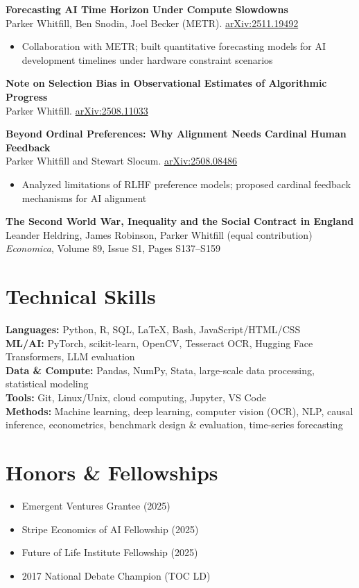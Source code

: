 \documentclass[11pt,letterpaper]{article}
\begin{document}
\vspace{4pt}

\textbf{Forecasting AI Time Horizon Under Compute Slowdowns} \\
Parker Whitfill, Ben Snodin, Joel Becker (METR). \href{https://arxiv.org/abs/2511.19492}{arXiv:2511.19492}
\begin{itemize}
    \item Collaboration with METR; built quantitative forecasting models for AI development timelines under hardware constraint scenarios
\end{itemize}

\vspace{4pt}

\textbf{Note on Selection Bias in Observational Estimates of Algorithmic Progress} \\
Parker Whitfill. \href{https://arxiv.org/abs/2508.11033}{arXiv:2508.11033}

\vspace{4pt}

\textbf{Beyond Ordinal Preferences: Why Alignment Needs Cardinal Human Feedback} \\
Parker Whitfill and Stewart Slocum. \href{https://arxiv.org/abs/2508.08486}{arXiv:2508.08486}
\begin{itemize}
    \item Analyzed limitations of RLHF preference models; proposed cardinal feedback mechanisms for AI alignment
\end{itemize}

\vspace{4pt}

\textbf{The Second World War, Inequality and the Social Contract in England} \\
Leander Heldring, James Robinson, Parker Whitfill (equal contribution) \\
\textit{Economica}, Volume 89, Issue S1, Pages S137--S159

\section{Technical Skills}

\textbf{Languages:} Python, R, SQL, \LaTeX, Bash, JavaScript/HTML/CSS \\
\textbf{ML/AI:} PyTorch, scikit-learn, OpenCV, Tesseract OCR, Hugging Face Transformers, LLM evaluation \\
\textbf{Data \& Compute:} Pandas, NumPy, Stata, large-scale data processing, statistical modeling \\
\textbf{Tools:} Git, Linux/Unix, cloud computing, Jupyter, VS Code \\
\textbf{Methods:} Machine learning, deep learning, computer vision (OCR), NLP, causal inference, econometrics, benchmark design \& evaluation, time-series forecasting

\section{Honors \& Fellowships}
\begin{itemize}
    \item Emergent Ventures Grantee (2025)
    \item Stripe Economics of AI Fellowship (2025)
    \item Future of Life Institute Fellowship (2025)
    \item 2017 National Debate Champion (TOC LD)
\end{itemize}
\end{document}
